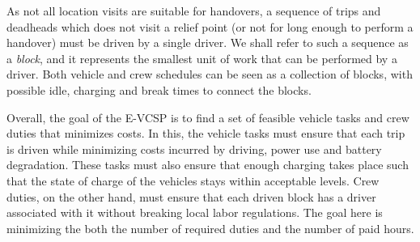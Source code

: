 \documentclass[]{article}
\begin{document}
As not all location visits are suitable for handovers, a sequence of trips and deadheads which does not visit a relief point (or not for long enough to perform a handover) must be driven by a single driver. We shall refer to such a sequence as a \emph{block}, and it represents the smallest unit of work that can be performed by a driver. Both vehicle and crew schedules can be seen as a collection of blocks, with possible idle, charging and break times to connect the blocks.

Overall, the goal of the E-VCSP is to find a set of feasible vehicle tasks and crew duties that minimizes costs. In this, the vehicle tasks must ensure that each trip is driven while minimizing costs incurred by driving, power use and battery degradation. These tasks must also ensure that enough charging takes place such that the state of charge of the vehicles stays within acceptable levels. Crew duties, on the other hand, must ensure that each driven block has a driver associated with it without breaking local labor regulations. The goal here is minimizing the both the number of required duties and the number of paid hours.
\end{document}
